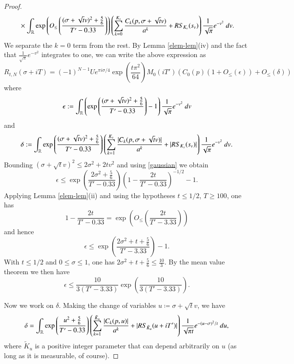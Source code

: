 \begin{proof}
\begin{align*}
&\quad \times \int_{\mathbb{R}} \exp\left( O_{\leq}\left(\frac{(\sigma + \sqrt{t} v)^2 + \frac{5}{6}}{T'-0.33} \right) \right) \left(\sum_{k=0}^{K_v} \frac{C_k(p,\sigma + \sqrt{t} v)}{a^k} + RS_{K_v}(s_v)\right) \frac{1}{\sqrt{\pi}} e^{-v^2}\ dv.
\end{align*}
We separate the $k=0$ term from the rest.
By Lemma \ref{elem-lem}(iv) and the fact that $\frac{1}{\sqrt{\pi}} e^{-v^2}$ integrates to one, we can write the above expression as
\begin{equation}\label{rtnst}
 R_{t,N}(\sigma+iT) = (-1)^{N-1} U e^{\pi i \sigma/4} \exp\left( \frac{t \pi^2}{64}\right) M_0(iT') \left( C_0(p) (1 + O_{\leq}(\epsilon)) + O_{\leq}(\delta) \right)
\end{equation}
where
$$ \epsilon := \int_{\mathbb{R}} \left( \exp\left( \frac{(\sigma + \sqrt{t} v)^2 + \frac{5}{6} }{T'-0.33} \right)  - 1\right) \frac{1}{\sqrt{\pi}} e^{-v^2}\ dv$$
and
$$ \delta := \int_{\mathbb{R}} \exp\left( \frac{(\sigma + \sqrt{t} v)^2 + \frac{5}{6}}{T'-0.33} \right) \left(\sum_{k=1}^{K_v} \frac{|C_k(p,\sigma+\sqrt{t}v)|}{a^k} + |RS_{K_v}(s_v)|\right) \frac{1}{\sqrt{\pi}} e^{-v^2}\ dv.$$
Bounding $(\sigma + \sqrt{t} v)^2 \leq 2 \sigma^2 + 2 t v^2$ and using \eqref{gaussian} we obtain
$$ \epsilon \leq \exp\left( \frac{2\sigma^2 + \frac{5}{6}}{T'-0.33} \right) \left(1 - \frac{2t}{T'-0.33}\right)^{-1/2} - 1.$$
Applying Lemma \ref{elem-lem}(ii) and using the hypotheses $t \leq 1/2$, $T \geq 100$, one has
$$ 1 - \frac{2t}{T'-0.33} = \exp\left( O_{\leq}\left( \frac{2t}{T'-3.33} \right)\right)$$
and hence
$$
 \epsilon \leq \exp\left( \frac{2\sigma^2 + t + \frac{5}{6}}{T'-3.33} \right) - 1.
$$
With $t \leq 1/2$ and $0 \leq \sigma \leq 1$, one has $2\sigma^2 + t + \frac{5}{6} \leq \frac{10}{3}$.  By the mean value theorem we then have
\begin{equation}\label{eep}
 \epsilon \leq \frac{10}{3(T'-3.33)} \exp\left( \frac{10}{3(T'-3.33)}\right).
\end{equation}

Now we work on $\delta$.  Making the change of variables $u \coloneqq \sigma + \sqrt{t} v$, we have
$$ \delta = \int_{\mathbb{R}} \exp\left( \frac{u^2 + \frac{5}{6}}{T'-0.33} \right) \left(\sum_{k=1}^{\tilde K_u} \frac{|C_k(p,u)|}{a^k} + |RS_{\tilde K_u}(u + iT')|\right) \frac{1}{\sqrt{\pi t}} e^{-(u-\sigma)^2/t}\ du,$$
where $\tilde K_u$ is a positive integer parameter that can depend arbitrarily on $u$ (as long as it is measurable, of course).  


\end{proof}
